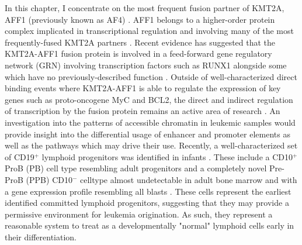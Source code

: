 In this chapter, I concentrate on the most frequent fusion partner of KMT2A, AFF1 (previously known as AF4) \cite{Meyer2017}. AFF1 belongs to a higher-order protein complex implicated in transcriptional regulation and involving many of the most frequently-fused KMT2A partners \cite{Yokoyama2010}. 
Recent evidence has suggested that the KMT2A-AFF1 fusion protein is involved in a feed-forward gene regulatory network (GRN) involving transcription factors such as RUNX1 alongside some which have no previously-described function \cite{Harman2021, Wilkinson2013}. 
Outside of well-characterized direct binding events where KMT2A-AFF1 is able to regulate the expression of key genes such as proto-oncogene MyC and BCL2, the direct and indirect regulation of transcription by the fusion protein remains an active area of research \cite{Harman2021}. 
An investigation into the patterns of accessible chromatin in leukemic samples would provide insight into the differential usage of enhancer and promoter elements as well as the pathways which may drive their use. 
Recently, a well-characterized set of CD19$^+$ lymphoid progenitors was identified in infants \cite{OByrne2019}. 
These include a CD10$^+$ ProB (PB) cell type resembling adult progenitors and a completely novel Pre-ProB (PPB) CD10$^-$ celltype almost undetectable in adult bone marrow and with a gene expression profile resembling \gls{all} blasts \cite{OByrne2019}. 
These cells represent the earliest identified committed lymphoid progenitors, suggesting that they may provide a permissive environment for leukemia origination. 
As such, they represent a reasonable system to treat as a developmentally "normal" lymphoid cells early in their differentiation.


